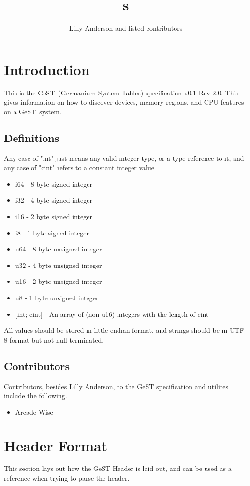 \documentclass{article}
\title{\name s}
\author{Lilly Anderson and listed contributors}
\def\version{0.1 Rev 2.0}
\def\name{Germanium System Table}
\def\sname{GeST}
\begin{document}
\maketitle

\section{Introduction}
This is the \sname\ (\name s) specification v\version. This gives information on how to discover devices, memory regions, and CPU features on a \sname\ system.

\subsection{Definitions}
Any case of "int" just means any valid integer type, or a type reference to it, and any case of "cint" refers to a constant integer value
\begin{itemize}
    \item i64 - 8 byte signed integer
    \item i32 - 4 byte signed integer
    \item i16 - 2 byte signed integer
    \item i8 - 1 byte signed integer
    \item u64 - 8 byte unsigned integer
    \item u32 - 4 byte unsigned integer
    \item u16 - 2 byte unsigned integer
    \item u8 - 1 byte unsigned integer
    \item {[int; cint]} - An array of (non-u16) integers with the length of cint
\end{itemize}
All values should be stored in little endian format, and strings should be in UTF-8 format but not null terminated.

\subsection{Contributors}
Contributors, besides Lilly Anderson, to the GeST specification and utilites include the following.
\begin{itemize}
    \item Arcade Wise
\end{itemize}

\pagebreak
\section{Header Format}
This section lays out how the GeST Header is laid out, and can be used as a reference when trying to parse the header.
\end{document}
